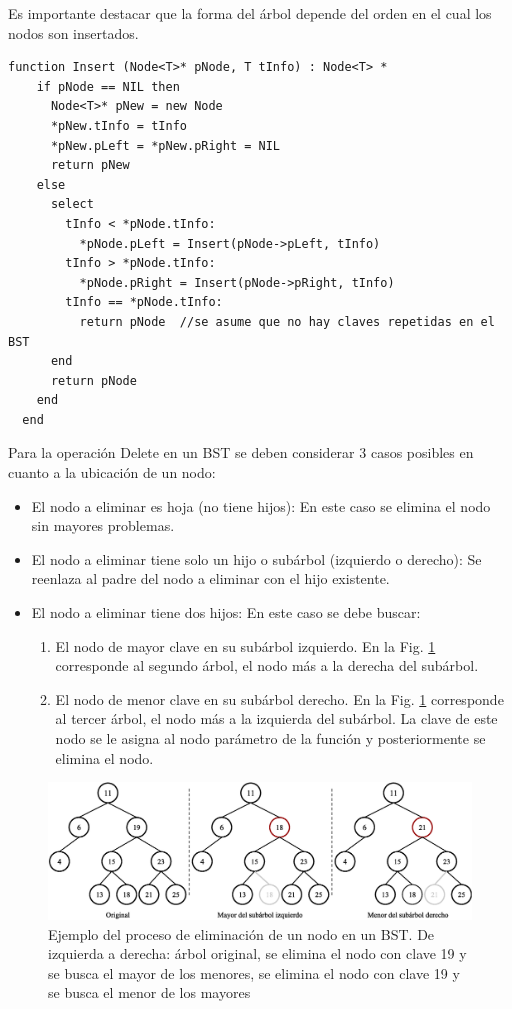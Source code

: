 Es importante destacar que la forma del árbol depende del orden en el cual los nodos son insertados.

\begin{lstlisting}[upquote=true, language=pseudo]
  function Insert (Node<T>* pNode, T tInfo) : Node<T> *
    if pNode == NIL then
      Node<T>* pNew = new Node
      *pNew.tInfo = tInfo
      *pNew.pLeft = *pNew.pRight = NIL
      return pNew
    else
      select
        tInfo < *pNode.tInfo:
          *pNode.pLeft = Insert(pNode->pLeft, tInfo)
        tInfo > *pNode.tInfo:  
          *pNode.pRight = Insert(pNode->pRight, tInfo)
        tInfo == *pNode.tInfo:
          return pNode	//se asume que no hay claves repetidas en el BST
      end
      return pNode
    end
  end
\end{lstlisting}

Para la operación Delete en un BST se deben considerar 3 casos posibles en cuanto a la ubicación de un nodo:
\begin{itemize}
\item El nodo a eliminar es hoja (no tiene hijos): En este caso se elimina el nodo sin
mayores problemas.
\item El nodo a eliminar tiene solo un hijo o subárbol (izquierdo o derecho): Se reenlaza
al padre del nodo a eliminar con el hijo existente.
\item El nodo a eliminar tiene dos hijos: En este caso se debe buscar:
\begin{enumerate}
\item El nodo de mayor clave en su subárbol izquierdo. En la Fig. \ref{fig:delsbt1} corresponde al segundo árbol, el nodo más a la derecha del subárbol.
\item El nodo de menor clave en su subárbol derecho. En la Fig. \ref{fig:delsbt1} corresponde al tercer árbol, el nodo más a la izquierda del subárbol.
La clave de este nodo se le asigna al nodo parámetro de la función y posteriormente se elimina el nodo.
\end{enumerate}
\end{itemize}

\begin{figure}[htpb!]
  \begin{center}
    \includegraphics[width=1.0\columnwidth]{images/BSTDelete1.eps}
  \end{center}
  \caption{Ejemplo del proceso de eliminación de un nodo en un BST. De izquierda a derecha: árbol original, se elimina el nodo con clave 19 y se busca el mayor de los menores, se elimina el nodo con clave 19 y se busca el menor de los mayores}
  \label{fig:delsbt1}
\end{figure}


